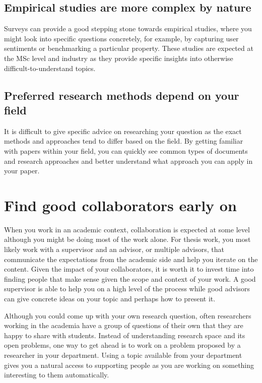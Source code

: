\subsection{Empirical studies are more complex by nature}

Surveys can provide a good stepping stone towards empirical studies, where you might look into specific questions concretely, for example, by capturing user sentiments or benchmarking a particular property.
These studies are expected at the MSc level and industry as they provide specific insights into otherwise difficult-to-understand topics.

\subsection{Preferred research methods depend on your field}

It is difficult to give specific advice on researching your question as the exact methods and approaches tend to differ based on the field.
By getting familiar with papers within your field, you can quickly see common types of documents and research approaches and better understand what approach you can apply in your paper.

\section{Find good collaborators early on}

When you work in an academic context, collaboration is expected at some level although you might be doing most of the work alone.
For thesis work, you most likely work with a supervisor and an advisor, or multiple advisors, that communicate the expectations from the academic side and help you iterate on the content.
Given the impact of your collaborators, it is worth it to invest time into finding people that make sense given the scope and context of your work.
A good supervisor is able to help you on a high level of the process while good advisors can give concrete ideas on your topic and perhaps how to present it.

Although you could come up with your own research question, often researchers working in the academia have a group of questions of their own that they are happy to share with students.
Instead of understanding research space and its open problems, one way to get ahead is to work on a problem proposed by a researcher in your department.
Using a topic available from your department gives you a natural access to supporting people as you are working on something interesting to them automatically.

